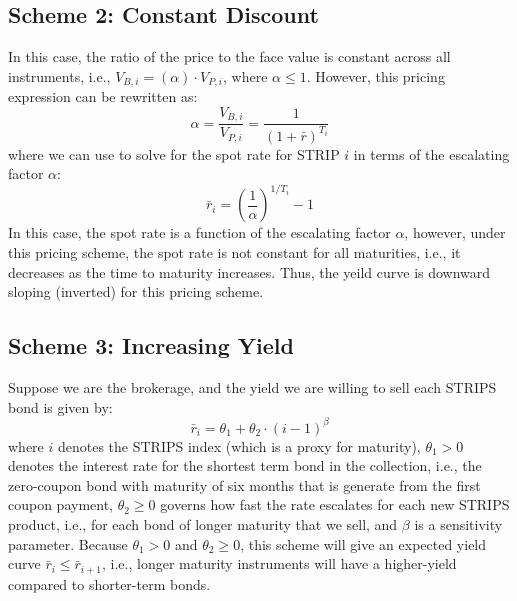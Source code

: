 \documentclass[11pt]{article}
\theoremstyle{definition}
\begin{document}
\subsection*{Scheme 2: Constant Discount}
In this case, the ratio of the price to the face value is constant across all instruments, i.e., $V_{B, i} = \left(\alpha\right)\cdot{V}_{P, i}$, where $\alpha\leq{1}$. However, this pricing expression can be rewritten as:
\begin{equation}
\alpha = \frac{V_{B,i}}{V_{P,i}} = \frac{1}{\left(1+\bar{r}\right)^{T_{i}}}
\end{equation}
where we can use to solve for the spot rate for STRIP $i$ in terms of the escalating factor $\alpha$:
\begin{equation}
\bar{r}_{i} = \left(\frac{1}{\alpha}\right)^{1/T_{i}} - 1
\end{equation}
In this case, the spot rate is a function of the escalating factor $\alpha$, however, under this pricing scheme, 
the spot rate is not constant for all maturities, i.e., it decreases as the time to maturity increases.
Thus, the yeild curve is downward sloping (inverted) for this pricing scheme.

\subsection*{Scheme 3: Increasing Yield}
Suppose we are the brokerage, and the yield we are willing to sell each STRIPS bond is given by:
\begin{equation}
\bar{r}_{i} = \theta_{1}+\theta_{2}\cdot\left(i-1\right)^{\beta}
\end{equation}
where $i$ denotes the STRIPS index (which is a proxy for maturity), 
$\theta_{1}>0$ denotes the interest rate for the shortest term bond in the collection, i.e., the zero-coupon bond with maturity of six months that is generate from the first coupon payment, $\theta_{2}\geq{0}$ governs how fast the rate escalates for each new STRIPS product, i.e., for each bond of longer maturity that we sell, and $\beta$ is a sensitivity parameter. Because $\theta_{1}>{0}$ and $\theta_{2}\geq{0}$, this scheme will give an expected yield curve $\bar{r}_{i}\leq\bar{r}_{i+1}$, i.e., longer maturity instruments will have a higher-yield compared to shorter-term bonds.
\end{document}
